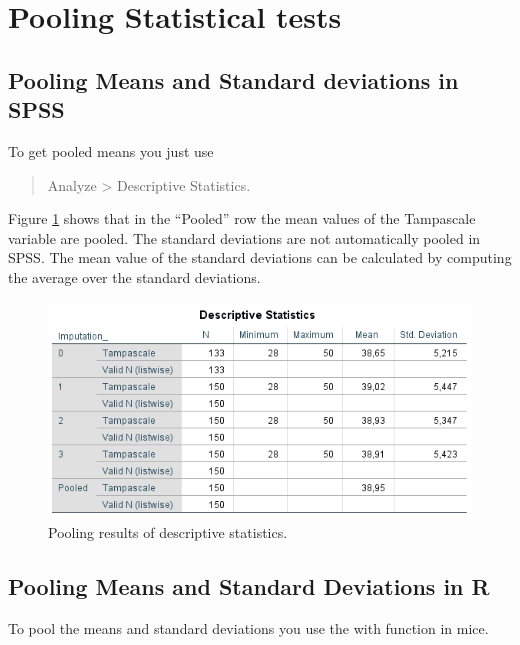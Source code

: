 \documentclass[]{book}
\begin{document}
\section{Pooling Statistical tests}\label{pooling-statistical-tests}

\subsection{Pooling Means and Standard deviations in
SPSS}\label{pooling-means-and-standard-deviations-in-spss}

To get pooled means you just use

\begin{quote}
Analyze \textgreater{} Descriptive Statistics.
\end{quote}

Figure \ref{fig:tab5-3} shows that in the ``Pooled'' row the mean values
of the Tampascale variable are pooled. The standard deviations are not
automatically pooled in SPSS. The mean value of the standard deviations
can be calculated by computing the average over the standard deviations.

\begin{figure}

{\centering \includegraphics[width=0.9\linewidth]{images/table5.3} 

}

\caption{Pooling results of descriptive statistics.}\label{fig:tab5-3}
\end{figure}

\subsection{Pooling Means and Standard Deviations in
R}\label{pooling-means-and-standard-deviations-in-r}

To pool the means and standard deviations you use the with function in
mice.
\end{document}
